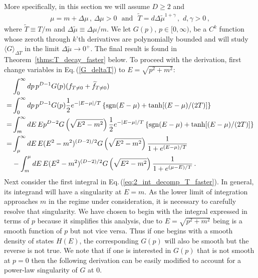 \documentclass[sn-mathphys,Numbered]{sn-jnl}
\newcommand{\req}[1]{Eq.\,(\ref{#1})}
\newcommand{\rTh}[1]{Theorem~{\ref{#1}}}
\begin{document}
More specifically, in this section we will assume $D\geq 2$ and
\begin{align}\label{eq:T_mu_relation}
 \mu=m+\Delta\mu\,, \,\Delta\mu>0 \,\, \text{ and } \,\, \widetilde{T}=d\Delta\widetilde{\mu}^{1+\gamma}\,, \,\,d,\gamma>0\,,
\end{align}
where $\widetilde{T}\equiv T/m$ and $\Delta\widetilde{\mu}\equiv \Delta\mu/m$. We let $G(p)$, $p\in[0,\infty)$, be a $C^k$ function whose zeroth through $k$'th derivatives are polynomially bounded and will study $\langle G\rangle_{\Delta T}$ in the limit $\Delta\widetilde{\mu}\to 0^+$. The final result is found in \rTh{thms:T_decay_faster} below. To proceed with the derivation, first change variables in \req{G_deltaT} to $E=\sqrt{p^2+m^2}$:
\begin{align}
 &\int_0^\infty dp\, p^{D-1} G(p)(f_{T\neq 0}+\widetilde{f}_{T\neq 0})\notag\\
=&\int_0^\infty dp\, p^{D-1} G(p)\frac{1}{2}e^{-|E-\mu|/T}\left\{\mathrm{sgn}(E-\mu)+\tanh[(E-\mu)/(2T)]\right\}\notag\\
 =&\int_m^\infty dE \,Ep^{D-2} G\left(\sqrt{E^2-m^2}\right)\frac{1}{2}e^{-|E-\mu|/T}\left\{\mathrm{sgn}(E-\mu)+\tanh[(E-\mu)/(2T)]\right\}\notag\\
 =&\int_{\mu}^\infty dE\, E(E^2-m^2)^{(D-2)/2} G\left(\sqrt{E^2-m^2}\right)
 \frac{1}{1+e^{(E-\mu)/T}}\label{eq:2_int_decomp_T_faster} \\
 &-\int_m^{\mu} dE \,E(E^2-m^2)^{(D-2)/2} G\left(\sqrt{E^2-m^2}\right)\frac{1}{1+e^{(\mu-E)/T}} \,.\notag
\end{align}
Next consider the first integral in \req{eq:2_int_decomp_T_faster}. In general, its integrand will have a singularity at $E=m$. As the lower limit of integration approaches $m$ in the regime under consideration, it is necessary to carefully resolve that singularity. We have chosen to begin with the integral expressed in terms of $p$ because it simplifies this analysis, due to $E=\sqrt{p^2+m^2}$ being is a smooth function of $p$ but not vice versa. Thus if one begins with a smooth density of states $H(E)$, the corresponding $G(p)$ will also be smooth but the reverse is not true. We note that if one is interested in $G(p)$ that is not smooth at $p=0$ then the following derivation can be easily modified to account for a power-law singularity of $G$ at $0$.
\end{document}
